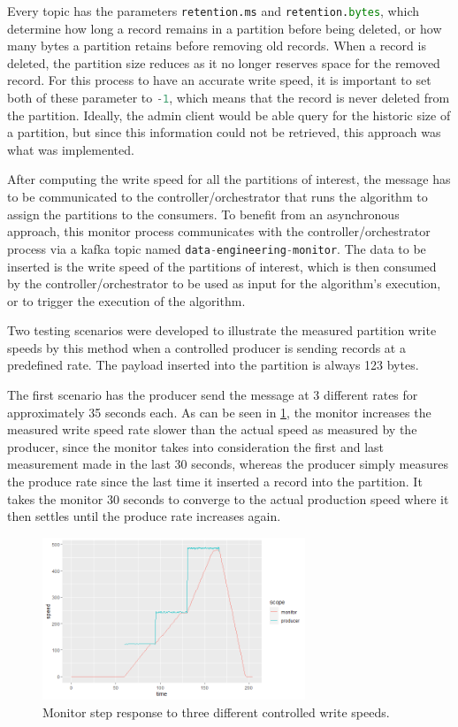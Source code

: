 Every topic has the parameters \lstinline[language=Python]{retention.ms} and
\lstinline[language=Python]{retention.bytes}, which determine how long a record
remains in a partition before being deleted, or how many bytes a partition
retains before removing old records. When a record is deleted, the partition
size reduces as it no longer reserves space for the removed record. For this
process to have an accurate write speed, it is important to set both of these
parameter to \lstinline[language=Python]{-1}, which means that the record is
never deleted from the partition. Ideally, the admin client would be able query
for the historic size of a partition, but since this information could not be
retrieved, this approach was what was implemented.

After computing the write speed for all the partitions of interest, the message
has to be communicated to the controller/orchestrator that runs the algorithm to
assign the partitions to the consumers. To benefit from an asynchronous
approach, this monitor process communicates with the controller/orchestrator
process via a kafka topic named
\lstinline[language=Python]{data-engineering-monitor}. The data to be inserted
is the write speed of the partitions of interest, which is then consumed by the
controller/orchestrator to be used as input for the algorithm's execution, or to
trigger the execution of the algorithm.


Two testing scenarios were developed to illustrate the measured partition write
speeds by this method when a controlled producer is sending records at a
predefined rate. The payload inserted into the partition is always 123 bytes.

The first scenario has the producer send the message at 3 different rates for
approximately 35 seconds each. As can be seen in \ref{fig:monitor_step}, the
monitor increases the measured write speed rate slower than the actual speed as
measured by the producer, since the monitor takes into consideration the first
and last measurement made in the last 30 seconds, whereas the producer simply
measures the produce rate since the last time it inserted a record into the
partition. It takes the monitor 30 seconds to converge to the actual production
speed where it then settles until the produce rate increases again.

\begin{figure}[H] \centering
\includegraphics[width=0.7\textwidth]{images/monitor/monitor_step.png}
\caption{Monitor step response to three different controlled write speeds.}
\label{fig:monitor_step} \end{figure}

